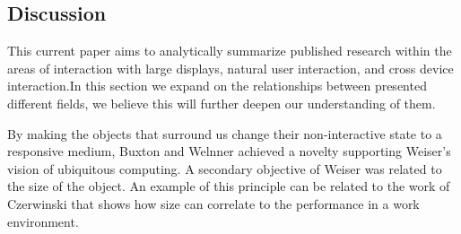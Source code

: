 \subsection{Discussion}
This current paper aims to analytically summarize published research within the areas of interaction with large displays, natural user interaction, and cross device interaction.In this section we expand on the relationships between presented different fields, we believe this will further deepen our understanding of them.

By making the objects that surround us change their non-interactive state to a responsive medium, Buxton and Welnner achieved a novelty supporting Weiser's vision of ubiquitous computing. A secondary objective of Weiser was related to the size of the object. An example of this principle can be related to the work of Czerwinski that shows how size can correlate to the performance in a work environment.

